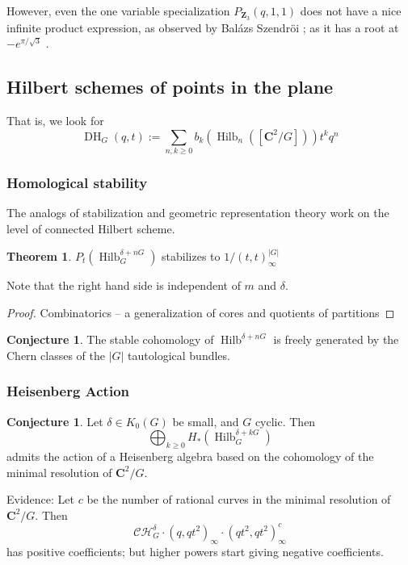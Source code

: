 \documentclass{amsart}[12pt]
\theoremstyle{definition}
\newtheorem{theorem}[dummy]{Theorem}
\newtheorem{conjecture}[dummy]{Conjecture}
\newcommand{\Z}{\mathbf{Z}}
\newcommand{\C}{\mathbf{C}}
\DeclareMathOperator{\Hilb}{Hilb}
\DeclareMathOperator{\DC}{DH}
\begin{document}
However, even the one variable specialization $P_{\Z_3}(q,1,1)$ does not have a nice infinite product expression, as observed by Bal\'azs Szendr\"oi \cite{Bmo}; as it has a root at $-e^{\pi/\sqrt{3}}$ \cite{Borwein2}.


\subsection{Hilbert schemes of points in the plane}


That is, we look for 
$$\DC_G(q,t):=\sum_{n,k\geq 0 } b_k(\Hilb_n([\C^2/G])) t^kq^n$$







\subsubsection{Homological stability}

The analogs of stabilization and geometric representation theory work on the level of connected Hilbert scheme.

\begin{theorem} 
$P_t(\Hilb^{\delta+nG}_G)$ stabilizes to $1/(t,t)_\infty^{|G|}$
\end{theorem}
Note that the right hand side is independent of $m$ and $\delta$.
\begin{proof} Combinatorics -- a generalization of cores and quotients of partitions \end{proof}

\begin{conjecture}
The stable cohomology of $\Hilb^{\delta+nG}$ is freely generated by the Chern classes of the $|G|$ tautological bundles.
\end{conjecture}



\subsubsection{Heisenberg Action}


\begin{conjecture}
Let $\delta\in K_0(G)$ be small, and $G$ cyclic.  Then
$$\bigoplus_{k\geq 0} H_*(\Hilb^{\delta+kG}_G)$$ admits the action of a Heisenberg algebra based on the cohomology of the minimal resolution of $\C^2/G$.
\end{conjecture}

Evidence:
Let $c$ be the number of rational curves in the minimal resolution of $\C^2/G$.  Then
$$\mathcal{CH}^\delta_G\cdot(q,qt^2)_\infty\cdot (qt^2,qt^2)_\infty^c$$
has positive coefficients; but higher powers start giving negative coefficients.
\end{document}
